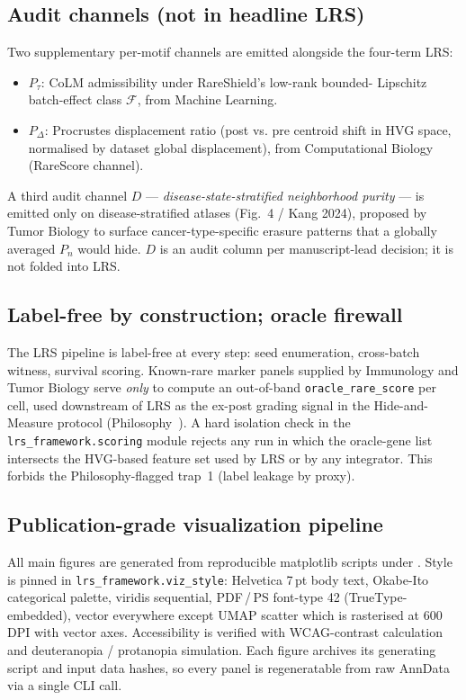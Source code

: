 \subsection{Audit channels (not in headline LRS)}
\label{sec:methods-audit}

Two supplementary per-motif channels are emitted alongside the four-term LRS:

\begin{itemize}
  \item $P_\tau$: CoLM admissibility under RareShield's low-rank bounded-%
        Lipschitz batch-effect class $\mathcal{F}$, from Machine Learning.
  \item $P_\Delta$: Procrustes displacement ratio (post vs. pre centroid shift
        in HVG space, normalised by dataset global displacement), from
        Computational Biology (RareScore channel).
\end{itemize}

A third audit channel $D$ — \emph{disease-state-stratified neighborhood
purity} — is emitted only on disease-stratified atlases (Fig.~4 / Kang 2024),
proposed by Tumor Biology to surface cancer-type-specific erasure patterns
that a globally averaged $P_n$ would hide. $D$ is an audit column per
manuscript-lead decision; it is not folded into LRS.

\subsection{Label-free by construction; oracle firewall}
\label{sec:methods-firewall}

The LRS pipeline is label-free at every step: seed enumeration, cross-batch
witness, survival scoring. Known-rare marker panels supplied by Immunology
and Tumor Biology serve \emph{only} to compute an out-of-band
\texttt{oracle\_rare\_score} per cell, used downstream of LRS as the
ex-post grading signal in the Hide-and-Measure protocol
(Philosophy~\cite{philo}). A hard isolation check in the
\texttt{lrs\_framework.scoring} module rejects any run in which the
oracle-gene list intersects the HVG-based feature set used by LRS or
by any integrator. This forbids the Philosophy-flagged trap~1
(label leakage by proxy).

\subsection{Publication-grade visualization pipeline}
\label{sec:methods-viz}

All main figures are generated from reproducible matplotlib scripts under
. Style is pinned in
\texttt{lrs\_framework.viz\_style}: Helvetica 7\,pt body text, Okabe-Ito
categorical palette, viridis sequential, PDF\,/\,PS font-type 42
(TrueType-embedded), vector everywhere except UMAP scatter which is
rasterised at 600\,DPI with vector axes. Accessibility is verified with
WCAG-contrast calculation and deuteranopia / protanopia simulation.
Each figure archives its generating script and input data hashes, so
every panel is regeneratable from raw AnnData via a single CLI call.

